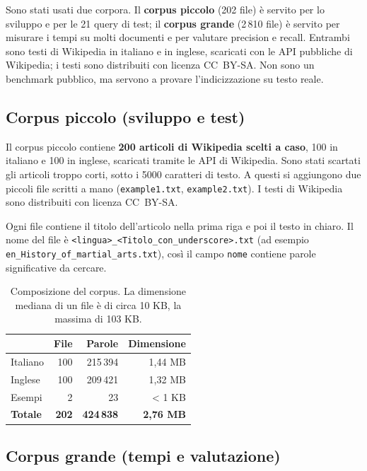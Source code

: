 \documentclass[11pt,a4paper]{article}
\newcommand{\code}[1]{\texttt{#1}}
\newcommand{\field}[1]{\texttt{#1}}
\begin{document}
Sono stati usati due corpora. Il \textbf{corpus piccolo} (202 file) è servito per lo
sviluppo e per le 21 query di test; il \textbf{corpus grande} (2\,810 file) è servito
per misurare i tempi su molti documenti e per valutare precision e recall. Entrambi
sono testi di Wikipedia in italiano e in inglese, scaricati con le API pubbliche di
Wikipedia; i testi sono distribuiti con licenza CC~BY-SA. Non sono un benchmark
pubblico, ma servono a provare l'indicizzazione su testo reale.

\subsection{Corpus piccolo (sviluppo e test)}
\label{sec:corpus-piccolo}

Il corpus piccolo contiene
\textbf{200 articoli di Wikipedia scelti a caso}, 100 in italiano e 100 in inglese,
scaricati tramite le API di Wikipedia. Sono stati scartati gli articoli troppo
corti, sotto i 5000 caratteri di testo. A questi si aggiungono due piccoli file
scritti a mano (\code{example1.txt}, \code{example2.txt}). I testi di Wikipedia
sono distribuiti con licenza CC~BY-SA.

Ogni file contiene il titolo dell'articolo nella prima riga e poi il testo in
chiaro. Il nome del file è \code{<lingua>\_<Titolo\_con\_underscore>.txt}
(ad esempio \code{en\_History\_of\_martial\_arts.txt}), così il campo \field{nome}
contiene parole significative da cercare.

\begin{table}[!htbp]
\centering
\begin{tabular}{@{}lrrr@{}}
\toprule
& \textbf{File} & \textbf{Parole} & \textbf{Dimensione} \\
\midrule
Italiano & 100 & 215\,394 & 1,44 MB \\
Inglese  & 100 & 209\,421 & 1,32 MB \\
Esempi   &   2 &       23 & < 1 KB \\
\midrule
\textbf{Totale} & \textbf{202} & \textbf{424\,838} & \textbf{2,76 MB} \\
\bottomrule
\end{tabular}
\caption{Composizione del corpus. La dimensione mediana di un file è di circa
10 KB, la massima di 103 KB.}
\label{tab:dataset}
\end{table}

\subsection{Corpus grande (tempi e valutazione)}
\label{sec:corpus-grande}
\end{document}

